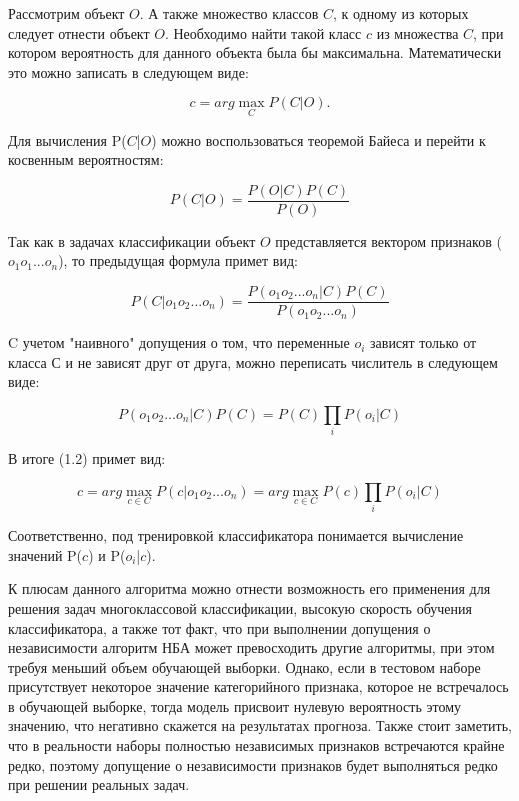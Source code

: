 Рассмотрим объект $O$. А также множество классов $C$, к одному из которых следует отнести объект $O$. Необходимо найти такой класс $c$ из множества $C$, при котором вероятность для данного объекта была бы максимальна. Математически это можно записать в следующем виде:

\begin{equation}
c = arg\max_{C} P(C|O).
\end{equation}

\vspace{\baselineskip}
Для вычисления  P($C$|$O$) можно воспользоваться теоремой Байеса и перейти к косвенным вероятностям:

\begin{equation}
P(C|O) = \frac{P(O|C)P(C)}{P(O)}
\end{equation}

\vspace{\baselineskip}
Так как в задачах классификации объект $O$ представляется вектором признаков ($o_1$$o_1$...$o_n$), то предыдущая формула примет вид:

\begin{equation}
P(C|o_1o_2...o_n) = \frac{P(o_1o_2...o_n|C)P(C)}{P(o_1o_2...o_n)}
\end{equation}

\vspace{\baselineskip}
C учетом "наивного" допущения о том, что переменные $o_i$ зависят только от класса $С$ и не зависят друг от друга, можно переписать числитель в следующем виде:

\begin{equation}
P(o_1o_2...o_n|C)P(C) = P(C)\prod\limits_{i}P(o_i|C)
\end{equation}

\vspace{\baselineskip}
В итоге (1.2) примет вид:

\begin{equation}
c = arg\max_{c \in C} P(c|o_1o_2...o_n) = arg\max_{c \in C} P(c)\prod\limits_{i}P(o_i|C)
\end{equation}

Соответственно, под тренировкой классификатора понимается вычисление значений P($c$) и P($o_i$|$c$).

К плюсам данного алгоритма можно отнести возможность его применения для решения задач многоклассовой классификации, высокую скорость обучения классификатора, а также тот факт, что при выполнении допущения о независимости алгоритм НБА может превосходить другие алгоритмы, при этом требуя меньший объем обучающей выборки. Однако, если в тестовом наборе присутствует некоторое значение категорийного признака, которое не встречалось в обучающей выборке, тогда модель присвоит нулевую вероятность этому значению, что негативно скажется на результатах прогноза. Также стоит заметить, что в реальности наборы полностью независимых признаков встречаются крайне редко, поэтому допущение о независимости признаков будет выполняться редко при решении реальных задач.

